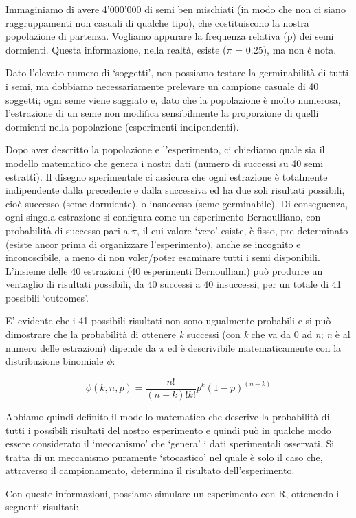 \documentclass[a4paper,12pt,oneside]{book}
\begin{document}
Immaginiamo di avere 4'000'000 di semi ben mischiati (in modo che non ci siano raggruppamenti non casuali di qualche tipo), che costituiscono la nostra popolazione di partenza. Vogliamo appurare la frequenza relativa (p) dei semi dormienti. Questa informazione, nella realtà, esiste (\(\pi\) = 0.25), ma non è nota.

Dato l'elevato numero di `soggetti', non possiamo testare la germinabilità di tutti i semi, ma dobbiamo necessariamente prelevare un campione casuale di 40 soggetti; ogni seme viene saggiato e, dato che la popolazione è molto numerosa, l'estrazione di un seme non modifica sensibilmente la proporzione di quelli dormienti nella popolazione (esperimenti indipendenti).

Dopo aver descritto la popolazione e l'esperimento, ci chiediamo quale sia il modello matematico che genera i nostri dati (numero di successi su 40 semi estratti). Il disegno sperimentale ci assicura che ogni estrazione è totalmente indipendente dalla precedente e dalla successiva ed ha due soli risultati possibili, cioè successo (seme dormiente), o insuccesso (seme germinabile). Di conseguenza, ogni singola estrazione si configura come un esperimento Bernoulliano, con probabilità di successo pari a \(\pi\), il cui valore `vero' esiste, è fisso, pre-determinato (esiste ancor prima di organizzare l'esperimento), anche se incognito e inconoscibile, a meno di non voler/poter esaminare tutti i semi disponibili. L'insieme delle 40 estrazioni (40 esperimenti Bernoulliani) può produrre un ventaglio di risultati possibili, da 40 successi a 40 insuccessi, per un totale di 41 possibili `outcomes'.

E' evidente che i 41 possibili risultati non sono ugualmente probabili e si può dimostrare che la probabilità di ottenere \emph{k} successi (con \emph{k} che va da 0 ad \emph{n}; \emph{n} è al numero delle estrazioni) dipende da \(\pi\) ed è descrivibile matematicamente con la distribuzione binomiale \(\phi\):

\[\phi(k, n, p) = \frac{n!}{(n-k)!k!} p^k (1 - p)^{(n-k)}\]

Abbiamo quindi definito il modello matematico che descrive la probabilità di tutti i possibili risultati del nostro esperimento e quindi può in qualche modo essere considerato il `meccanismo' che `genera' i dati sperimentali osservati. Si tratta di un meccanismo puramente `stocastico' nel quale è solo il caso che, attraverso il campionamento, determina il risultato dell'esperimento.

Con queste informazioni, possiamo simulare un esperimento con R, ottenendo i seguenti risultati:
\end{document}
